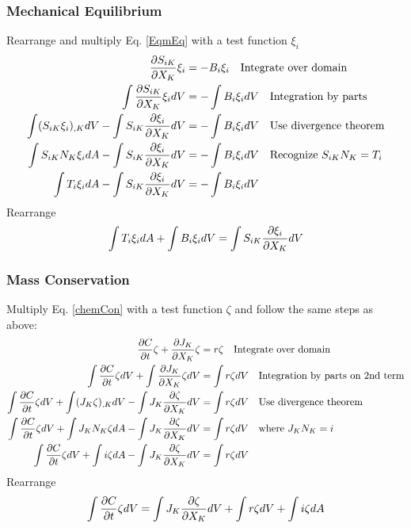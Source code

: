 \documentclass[12pt,3p]{article}
\numberwithin{equation}{section}
\begin{document}
\subsubsection{Mechanical Equilibrium} 
Rearrange and multiply Eq. \ref{EqmEq} with a test function $\xi_i$
\begin{align*}
\pdv{S_{iK}}{X_K} \xi_i &= - B_i \xi_i \quad \text{Integrate over domain} \\
\int \pdv{S_{iK}}{X_K} \xi_i dV &= - \int  B_i \xi_i dV \quad \text{Integration by parts} \\
\int (S_{iK} \xi_i)_{,K} dV - \int S_{iK} \pdv{\xi_i}{X_K} dV &= - \int  B_i \xi_i dV \quad \text{Use divergence theorem} \\
\int S_{iK} N_K \xi_i dA - \int S_{iK} \pdv{\xi_i}{X_K} dV &= - \int  B_i \xi_i dV \quad \text{Recognize } S_{iK} N_K = T_i \\
\int T_i \xi_i dA - \int S_{iK} \pdv{\xi_i}{X_K} dV &= - \int B_i \xi_i dV 
\end{align*}
Rearrange
\begin{equation}\label{2}
\int T_i \xi_i dA + \int  B_i \xi_i dV = \int S_{iK} \pdv{\xi_i}{X_K} dV
\end{equation}

\subsubsection{Mass Conservation}
Multiply Eq. \ref{chemCon} with a test function $\zeta$ and follow the same steps as above: 
\begin{align*}
\pdv{C}{t} \zeta + \pdv{J_K}{X_K} \zeta &= r \zeta \quad \text{Integrate over domain} \\
\int \pdv{C}{t} \zeta dV + \int \pdv{J_K}{X_K} \zeta dV &= \int r \zeta dV \quad \text{Integration by parts on 2nd term} \\
\int \pdv{C}{t} \zeta dV + \int (J_K \zeta)_{,K} dV - \int J_K \pdv{\zeta}{X_K} dV &= \int r \zeta dV  \quad \text{Use divergence theorem} \\
\int \pdv{C}{t} \zeta dV + \int J_K N_K \zeta dA - \int J_K \pdv{\zeta}{X_K} dV &= \int r \zeta dV \quad \text{where } J_K N_K = i \\
\int \pdv{C}{t} \zeta dV + \int i \zeta dA - \int J_K \pdv{\zeta}{X_K} dV &= \int r \zeta dV
\end{align*}
Rearrange
\begin{equation}\label{8}
\int \pdv{C}{t} \zeta dV = \int J_K \pdv{\zeta}{X_K} dV + \int r \zeta dV + \int i \zeta dA
\end{equation}
\end{document}
